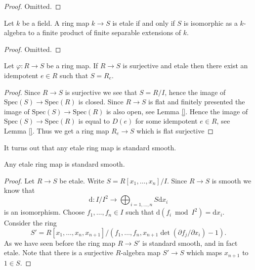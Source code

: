 \begin{proof}
Omitted.
\end{proof}

\begin{lemma}
\label{lemma-etale-over-field}
Let $k$ be a field.
A ring map $k \to S$ is etale if and only if $S$ is isomorphic
as a $k$-algebra to a finite product of finite separable extensions
of $k$.
\end{lemma}

\begin{proof}
Omitted.
\end{proof}

\begin{lemma}
\label{lemma-surjective-etale}
Let $\varphi :R \to S$ be a ring map.
If $R \to S$ is surjective and etale then there exist an
idempotent $e \in R$ such that $S = R_e$.
\end{lemma}

\begin{proof}
Since $R \to S$ is surjective we see that $S = R/I$, hence
the image of $\text{Spec}(S) \to \text{Spec}(R)$ is closed.
Since $R \to S$ is flat and finitely presented the image
of $\text{Spec}(S) \to \text{Spec}(R)$ is also open, see
Lemma \ref{}.
Hence the image of $\text{Spec}(S) \to \text{Spec}(R)$ is equal
to $D(e)$ for some idempotent $e \in R$, see
Lemma \ref{}.
Thus we get a ring map $R_e \to S$ which is flat surjective
\end{proof}

\noindent
It turns out that any etale ring map is standard smooth.

\begin{lemma}
\label{lemma-etale-standard-smooth}
Any etale ring map is standard smooth.
\end{lemma}

\begin{proof}
Let $R \to S$ be etale. 
Write $S = R[x_1, \ldots, x_n]/I$.
Since $R \to S$ is smooth we know that
$$
\text{d} :
I/I^2
\longrightarrow
\bigoplus\nolimits_{i = 1, \ldots, n} S\text{d}x_i
$$
is an isomorphism. Choose $f_1, \ldots, f_n \in I$ such that
$\text{d}(f_i \bmod I^2) = \text{d}x_i$. Consider the ring
$$
S' = R[x_1, \ldots, x_n, x_{n + 1}]/
(f_1, \ldots, f_n, x_{n + 1}\det(\partial f_j/\partial x_i) - 1).
$$
As we have seen before the ring map $R \to S'$ is standard smooth,
and in fact etale. Note that there is a surjective $R$-algebra map
$S' \to S$ which maps $x_{n + 1}$ to $1 \in S$.


\end{proof}














